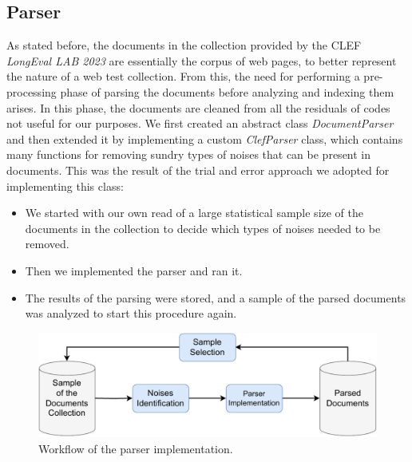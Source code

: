 \subsection{Parser} \label{parser_subsec}
As stated before, the documents in the collection provided by the \ac{CLEF} \textit{LongEval LAB 2023} \cite{cleflongeval} are essentially the corpus of web pages, to better represent the nature of a web test collection.
From this, the need for performing a pre-processing phase of parsing the documents before analyzing and indexing them arises.
In this phase, the documents are cleaned from all the residuals of codes not useful for our purposes. 
We first created an abstract class \textit{DocumentParser} and then extended it by implementing a custom \textit{ClefParser} class, which contains many functions for removing sundry types of noises that can be present in documents. 
This was the result of the trial and error approach we adopted for implementing this class:
\begin{itemize}
\item We started with our own read of a large statistical sample size of the documents in the collection to decide which types of noises needed to be removed.
\item Then we implemented the parser and ran it.
\item The results of the parsing were stored, and a sample of the parsed documents was analyzed to start this procedure again.
\end{itemize}

\begin{figure}[!h]
    \centering
    \includegraphics[width=0.8\linewidth]{figure/Parser_implementation_workflow.pdf}
    \caption{Workflow of the parser implementation.}
    \label{fig:Parser_implementation_workflow}
\end{figure}

